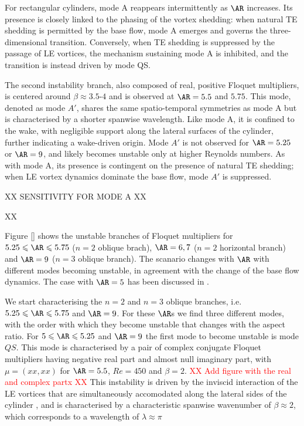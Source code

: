 For rectangular cylinders, mode A reappears intermittently as $\AR$ increases. Its presence is closely linked to the phasing of the vortex shedding: when natural TE shedding is permitted by the base flow, mode A emerges and governs the three-dimensional transition. Conversely, when TE shedding is suppressed by the passage of LE vortices, the mechanism sustaining mode A is inhibited, and the transition is instead driven by mode QS.

The second instability branch, also composed of real, positive Floquet multipliers, is centered around $\beta \approx 3.5$-$4$ and is observed at $\AR = 5.5$ and $5.75$. This mode, denoted as mode $A'$, shares the same spatio-temporal symmetries as mode A but is characterised by a shorter spanwise wavelength. Like mode A, it is confined to the wake, with negligible support along the lateral surfaces of the cylinder, further indicating a wake-driven origin. Mode $A'$ is not observed for $\AR = 5.25$ or $\AR = 9$, and likely becomes unstable only at higher Reynolds numbers. As with mode A, its presence is contingent on the presence of natural TE shedding; when LE vortex dynamics dominate the base flow, mode $A'$ is suppressed.

XX SENSITIVITY FOR MODE A XX

XX

Figure \ref{} shows the unstable branches of Floquet multipliers for $5.25 \le \AR \le 5.75$ ($n=2$ oblique brach), $\AR=6,7$ ($n=2$ horizontal branch) and $\AR=9$ ($n=3$ oblique branch). The scanario changes with $\AR$ with different modes becoming unstable, in agreement with the change of the base flow dynamics. The case with $\AR=5$ has been discussed in \cite{chiarini-quadrio-auteri-2022d}.

We start characterising the $n=2$ and $n=3$ oblique branches, i.e. $5.25 \le \AR \le 5.75$ and $\AR=9$. For these $\AR$s we find three different modes, with the order with which they become unstable that changes with the aspect ratio. For $5 \le \AR \le 5.25$ and $\AR=9$ the first mode to become unstable is mode $QS$. This mode is characterised by a pair of complex conjugate Floquet multipliers having negative real part and almost null imaginary part, with $\mu = (xx,xx)$ for $\AR=5.5$, $Re=450$ and $\beta=2$. \textcolor{red}{XX Add figure with the real and complex partx XX} This instability is driven by the inviscid interaction of the LE vortices that are simultaneously accomodated along the lateral sides of the cylinder \citep{pierrhumbert-widnall-1982}, and is characterised by a characteristic spanwise wavenumber of $\beta \approx 2$, which corresponds to a wavelength of $\lambda \approx \pi$


